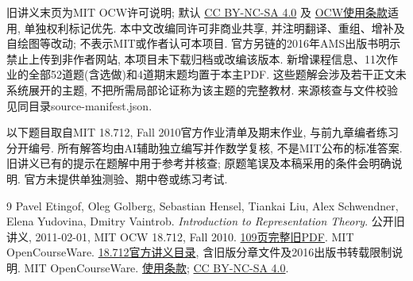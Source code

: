 旧讲义末页为MIT OCW许可说明; 默认 \href{https://creativecommons.org/licenses/by-nc-sa/4.0/}{CC BY-NC-SA 4.0} 及 \href{https://ocw.mit.edu/pages/privacy-and-terms-of-use/}{OCW使用条款}适用, 单独权利标记优先. 本中文改编同许可非商业共享, 并注明翻译、重组、增补及自绘图等改动; 不表示MIT或作者认可本项目. 官方另链的2016年AMS出版书明示禁止上传到非作者网站, 本项目未下载归档或改编该版本. 新增课程信息、11次作业的全部52道题(含选做)和4道期末题均置于本主PDF. 这些题解会涉及若干正文未系统展开的主题, 不把所需局部论证称为该主题的完整教材. 来源核查与文件校验见同目录source-manifest.json.
\clearpage
\originalcontents
\clearpage
\mainmatter









\label{ch:course-problems}
以下题目取自MIT 18.712, Fall 2010官方作业清单及期末作业, 与前九章编者练习分开编号. 所有解答均由AI辅助独立编写并作数学复核, 不是MIT公布的标准答案. 旧讲义已有的提示在题解中用于参考并核查; 原题笔误及本稿采用的条件会明确说明. 官方未提供单独测验、期中卷或练习考试.








\begin{thebibliography}{9}
 Pavel Etingof, Oleg Golberg, Sebastian Hensel, Tiankai Liu, Alex Schwendner, Elena Yudovina, Dmitry Vaintrob. \textit{Introduction to Representation Theory}. 公开旧讲义, 2011-02-01, MIT OCW 18.712, Fall 2010. \href{https://ocw.mit.edu/courses/18-712-introduction-to-representation-theory-fall-2010/24d8b3fa2ce48e48ee6c2d8d5e3562f6_MIT18_712F10_replect.pdf}{109页完整旧PDF}.
 MIT OpenCourseWare. \href{https://ocw.mit.edu/courses/18-712-introduction-to-representation-theory-fall-2010/pages/lecture-notes/}{18.712官方讲义目录}, 含旧版分章文件及2016出版书转载限制说明.
 MIT OpenCourseWare. \href{https://ocw.mit.edu/pages/privacy-and-terms-of-use/}{使用条款}; \href{https://creativecommons.org/licenses/by-nc-sa/4.0/}{CC BY-NC-SA 4.0}.
\end{thebibliography}

